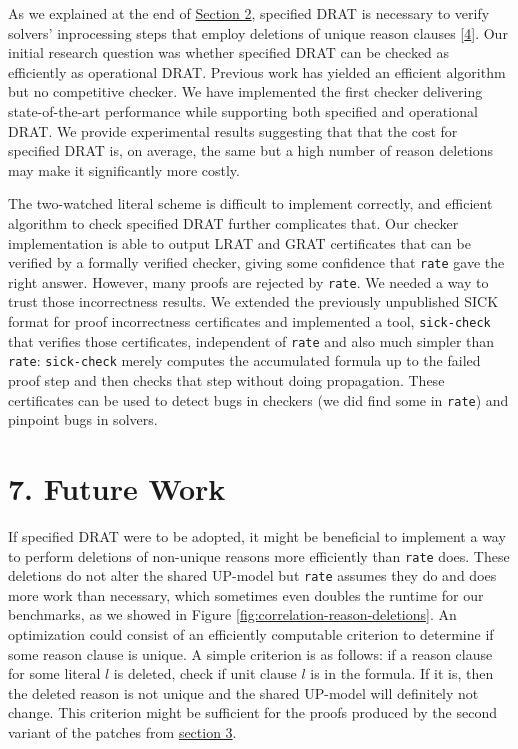\documentclass[
]{report}
\begin{document}
As we explained at the end of \protect\hyperlink{preliminaries}{Section
2}, specified DRAT is necessary to verify solvers' inprocessing steps
that employ deletions of unique reason clauses
{[}\protect\hyperlink{ref-DBLP:confux2fsatux2fRebola-PardoB18}{4}{]}.
Our initial research question was whether specified DRAT can be checked
as efficiently as operational DRAT. Previous work has yielded an
efficient algorithm but no competitive checker. We have implemented the
first checker delivering state-of-the-art performance while supporting
both specified and operational DRAT. We provide experimental results
suggesting that that the cost for specified DRAT is, on average, the
same but a high number of reason deletions may make it significantly
more costly.

The two-watched literal scheme is difficult to implement correctly, and
efficient algorithm to check specified DRAT further complicates that.
Our checker implementation is able to output LRAT and GRAT certificates
that can be verified by a formally verified checker, giving some
confidence that \texttt{rate} gave the right answer. However, many
proofs are rejected by \texttt{rate}. We needed a way to trust those
incorrectness results. We extended the previously unpublished SICK
format for proof incorrectness certificates and implemented a tool,
\texttt{sick-check} that verifies those certificates, independent of
\texttt{rate} and also much simpler than \texttt{rate}:
\texttt{sick-check} merely computes the accumulated formula up to the
failed proof step and then checks that step without doing propagation.
These certificates can be used to detect bugs in checkers (we did find
some in \texttt{rate}) and pinpoint bugs in solvers.

\hypertarget{future-work}{%
\chapter{7. Future Work}\label{future-work}}

If specified DRAT were to be adopted, it might be beneficial to
implement a way to perform deletions of non-unique reasons more
efficiently than \texttt{rate} does. These deletions do not alter the
shared UP-model but \texttt{rate} assumes they do and does more work
than necessary, which sometimes even doubles the runtime for our
benchmarks, as we showed in Figure
\ref{fig:correlation-reason-deletions}. An optimization could consist of
an efficiently computable criterion to determine if some reason clause
is unique. A simple criterion is as follows: if a reason clause for some
literal \(l\) is deleted, check if unit clause \(l\) is in the formula.
If it is, then the deleted reason is not unique and the shared UP-model
will definitely not change. This criterion might be sufficient for the
proofs produced by the second variant of the patches from
\protect\hyperlink{drat-proofs-without-deletions-of-unique-reason-clauses}{section
3}.
\end{document}
